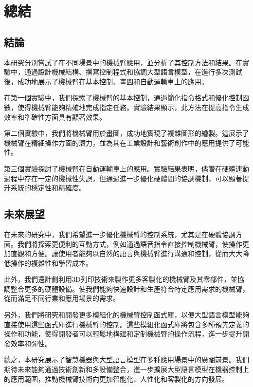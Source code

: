 \documentclass[class=NCU_thesis, crop=false]{standalone}
\begin{document}
\chapter{總結}

\section{結論}

本研究分別嘗試了在不同場景中的機械臂應用，並分析了其控制方法和結果。在實驗中，通過設計機械結構、撰寫控制程式和協調大型語言模型，在進行多次測試後，成功地展示了機械臂在基本控制、畫圖和自動運輸車上的應用。

在第一個實驗中，我們探索了機械臂的基本控制，通過簡化指令格式和優化控制函數，使得機械臂能夠精確地完成指定任務。實驗結果顯示，此方法在提高指令生成效率和準確性方面具有顯著效果。

第二個實驗中，我們將機械臂用於畫圖，成功地實現了複雜圖形的繪製。這展示了機械臂在精細操作方面的潛力，並為其在工業設計和藝術創作中的應用提供了可能性。

第三個實驗探討了機械臂在自動運輸車上的應用。實驗結果表明，儘管在硬體連動過程中存在一定的機械性失誤，但通過進一步優化硬體間的協調機制，可以顯著提升系統的穩定性和精確度。

\section{未來展望}

在未來的研究中，我們希望進一步優化機械臂的控制系統，尤其是在硬體協調方面。我們將探索更便利的互動方式，例如通過語音指令直接控制機械臂，使操作更加直觀和方便。讓使用者能夠以自然的語言與機械臂進行溝通和控制，從而大大降低操作的複雜性和學習成本。

此外，我們還計劃利用3D列印技術來製作更多客製化的機械臂及其零部件，並協調整合更多的硬體設備。使我們能夠快速設計和生產符合特定應用需求的機械臂，從而滿足不同行業和應用場景的需求。

另外，我們將研究和開發更多模組化的機械臂控制函式庫，以便大型語言模型能夠直接使用這些函式庫進行機械臂的控制。這些模組化函式庫將包含多種預先定義的操作和功能，使得開發者可以輕鬆地構建和定制機械臂的操作流程，進一步提升開發效率和彈性。

總之，本研究展示了智慧機器與大型語言模型在多種應用場景中的廣闊前景。我們期待未來能夠通過技術創新和多設備整合，進一步擴展大型語言模型在機器控制上的應用範圍，推動機械臂技術向更加智能化、人性化和客製化的方向發展。
\end{document}
